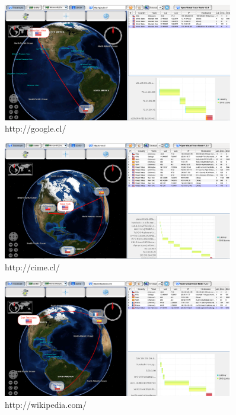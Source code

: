 \documentclass{article}
\begin{document}
\begin{enumerate}
\begin{figure}[!ht]  
\begin{center} 
\includegraphics[width=0.9\textwidth]{pantalla2.png} 
\caption{http://google.cl/}
\end{center}
\end{figure}

\begin{figure}[!ht]  
\begin{center} 
\includegraphics[width=0.9\textwidth]{pantalla3.png} 
\caption{http://cime.cl/}
\end{center}
\end{figure}

\begin{figure}[!ht]  
\begin{center} 
\includegraphics[width=0.9\textwidth]{pantalla4.png} 
\caption{http://wikipedia.com/}
\end{center}
\end{figure}


\end{enumerate}
\end{document}
